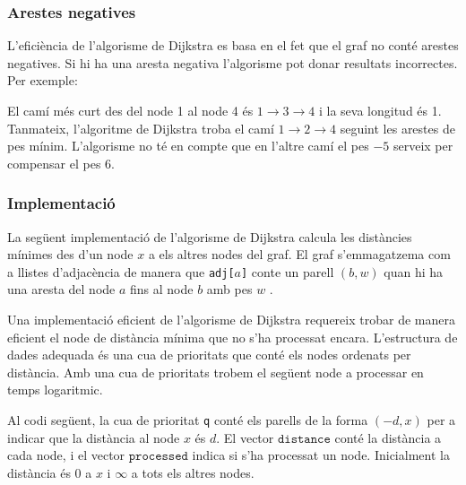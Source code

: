 \subsubsection{Arestes negatives}

L'eficiència de l'algorisme de Dijkstra es basa en el fet que el graf
no conté arestes negatives. Si hi ha una aresta negativa l'algorisme
pot donar resultats incorrectes. Per exemple:


\begin{center}
\end{center}
\noindent El camí més curt des del node 1 al node 4 és $1 \rightarrow
3 \rightarrow 4$ i la seva longitud és 1. Tanmateix, l'algoritme de
Dijkstra troba el camí $1 \rightarrow 2 \rightarrow 4$ seguint les
arestes de pes mínim. L'algorisme no té en compte que en l'altre camí
el pes $-5$ serveix per compensar el pes $6$.

\subsubsection{Implementació}

La següent implementació de l'algorisme de Dijkstra calcula les
distàncies mínimes des d'un node $x$ a els altres nodes del graf. El graf
s'emmagatzema com a llistes d'adjacència de manera que
\texttt{adj[$a$]} conte un parell $(b,w)$ quan hi ha una
aresta del node $a$ fins al node $b$ amb pes $w$ .

Una implementació eficient de l'algorisme de Dijkstra requereix trobar
de manera eficient el node de distància mínima que no s'ha processat
encara. L'estructura de dades adequada és una cua de prioritats que
conté els nodes ordenats per distància. Amb una cua de prioritats
trobem el següent node a processar en temps logaritmic.

Al codi següent, la cua de prioritat \texttt{q} conté els parells de
la forma $(-d,x)$ per a indicar que la distància al node $x$ és
$d$. El vector $\texttt{distance}$ conté la distància a cada node, i
el vector $\texttt{processed}$ indica si s'ha processat un
node. Inicialment la distància és $0$ a $x$ i $\infty$ a tots els
altres nodes.



